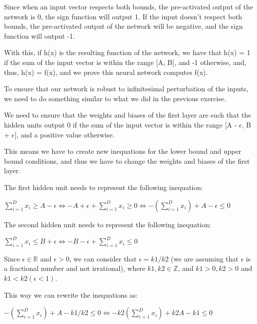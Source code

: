 \documentclass{article}
\begin{document}
Since when an input vector respects both bounds, the pre-activated output of the network is 0, the sign function will output 1. If the input doesn't
respect both bounds, the pre-activated output of the network will be negative, and the sign function will output -1.

With this, if h(x) is the resulting function of the network, we have that h(x) = 1 if the sum of the input vector is within the range [A, B], 
and -1 otherwise, and, thus, h(x) = f(x), and we prove this neural network computes f(x).

\bigskip

To ensure that our network is robust to infinitesimal perturbation of the inputs, we need to do something similar to what we did in the previous exercise.

We need to ensure that the weights and biases of the first layer are such that the hidden units output 0 if the sum of the input vector is 
within the range [A - $\epsilon$, B + $\epsilon$], and a positive value otherwise.

This means we have to create new inequations for the lower bound and upper bound conditions, 
and thus we have to change the weights and biases of the first layer.

\bigskip

The first hidden unit needs to represent the following inequation:

\bigskip

$ \sum_{i=1}^{D} x_i \geq A - \epsilon \iff -A + \epsilon + \sum_{i=1}^{D} x_i \geq 0 
\iff -(\sum_{i=1}^{D} x_i) + A - \epsilon \leq 0$

\bigskip

The second hidden unit needs to represent the following inequation:

\bigskip

$ \sum_{i=1}^{D} x_i \leq B + \epsilon \iff -B - \epsilon + \sum_{i=1}^{D} x_i \leq 0$

\bigskip

Since $\epsilon \in \mathbb{R}$ and $\epsilon > 0$, we can consider that $\epsilon = k1/k2$ (we are assuming that $\epsilon$
is a fractional number and not irrational), where $k1, k2 \in \mathbb{Z}$, and $k1 > 0, k2 > 0$ and $k1 < k2 (\epsilon < 1)$.

\bigskip

This way we can rewrite the inequations as:

\bigskip

$ -(\sum_{i=1}^{D} x_i) + A - k1/k2 \leq 0 \iff -k2(\sum_{i=1}^{D} x_i) + k2A - k1 \leq 0$
\end{document}
